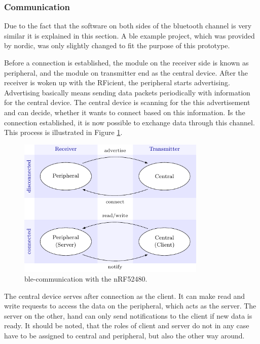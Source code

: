 \subsubsection{Communication}
Due to the fact that the software on both sides of the bluetooth channel is very similar it is explained in this section.
A \acs{ble} example project, which was provided by nordic, was only slightly changed to fit the purpose of this prototype.

Before a connection is established, the module on the receiver side is known as peripheral, and the module on transmitter end as the central device.
After the receiver is woken up with the RFicient, the peripheral starts advertising.
Advertising basically means sending data packets periodically with information for the central device.
The central device is scanning for the this advertisement and can decide, whether it wants to connect based on this information.
Is the connection established, it is now possible to exchange data through this channel.
This process is illustrated in Figure \ref{software:ble}.
\begin{figure}[ht]
	\centering
	\includegraphics[width=0.8\textwidth]{4-development/software/graphics/ble.pdf}
	\caption{\acs{ble}-communication with the nRF52480.\label{software:ble}}
\end{figure}

The central device serves after connection as the client.
It can make read and write requests to access the data on the peripheral, which acts as the server.
The server on the other, hand can only send notifications to the client if new data is ready.
It should be noted, that the roles of client and server do not in any case have to be assigned to central and peripheral, but also the other way around. 

